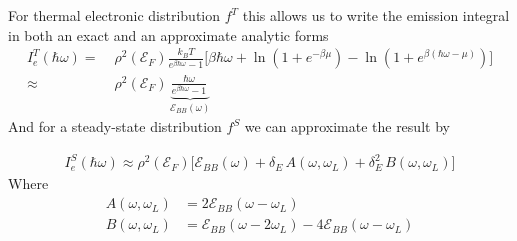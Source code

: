 For thermal electronic distribution $f^{T}$ this allows us to write the emission integral in both an exact and an approximate analytic forms
\begin{align} 
I^{T}_{e}(\hbar\omega)=\; &\rho^{2}(\mathcal{E}_{F}) \frac{k_BT}{e^{\beta\hbar\omega}-1}\Big[\beta\hbar\omega+\ln\left(1+e^{-\beta\mu}\right)-\ln\left(1+e^{\beta(\hbar\omega-\mu)}\right)\Big]
\label{eq:intraband_thermal_exact}\\
\approx\;& \rho^{2}(\mathcal{E}_{F})\,\underbrace{ \frac{\hbar\omega}{e^{\beta\hbar\omega}-1}\, }_{ \mathcal{E}_{BB}(\omega) }
\label{eq:intraband_thermal_approx}
\end{align}
And for a steady-state distribution $f^{S}$ we can approximate the result by

\begin{equation}
\begin{aligned}
I_{e}^{S}(\hbar\omega)\approx \rho^{2}(\mathcal{E}_{F})\Big[ \mathcal{E}_{BB}(\omega) + \delta_{E} \, A(\omega, \omega_{L}) + \delta^{2}_{E} \, B(\omega, \omega_{L}) \Big]
\end{aligned}
\label{eq:intraband_steady_state}
\end{equation}
Where 
\begin{align}
A(\omega, \omega_{L}) &= 2\mathcal{E}_{BB}(\omega-\omega_{L}) \\
B(\omega, \omega_{L}) &= \mathcal{E}_{BB}(\omega-2\omega_{L}) - 4\mathcal{E}_{BB}(\omega-\omega_{L})
\label{eq:intraband_A_B}
\end{align}






